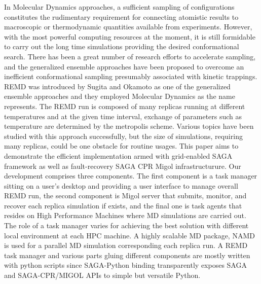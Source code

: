 \documentclass[times, 10pt,twocolumn]{article}
\begin{document}
In Molecular Dynamics approaches, a sufficient sampling of configurations constitutes the rudimentary requirement for connecting atomistic results to macroscopic or thermodynamic quantities available from experiments.   However,  with the most powerful computing resources at the moment, it is still formidable to carry out the long time simulations providing the desired conformational search.   There has been a great number of research efforts to accelerate sampling, and the generalized ensemble approaches have been proposed to overcome an inefficient conformational sampling presumably associated with kinetic trappings.  REMD was introduced by Sugita and Okamoto as one of the generalized ensemble approaches and they employed Molecular Dynamics as the name represents.  The REMD run is composed of many replicas running at different temperatures and at the given time interval, exchange of parameters such as temperature are determined by the metropolis scheme.  Various topics have been studied with this approach successfully, but the size of simulations, requiring many replicas, could be one obstacle for routine usages.  This paper aims to demonstrate the efficient implementation armed with grid-enabled SAGA framework as well as fault-recovery SAGA CPR Migol infrastructurure.  Our development comprises three components.  The first component is a task manager sitting on a user's desktop and providing a user interface to manage overall REMD run, the second component is Migol server that submits, monitor, and recover each replica simulation if exists, and the final one is task agents that resides on High Performance Machines where MD simulations are carried out.  The role of a task manager varies for achieving the best solution with different local environment at each HPC machine.  A highly scalable MD package, NAMD~\cite{Phillips:2005gd} is used for a parallel MD simulation corresponding each replica run.  A REMD task manager and various parts gluing different components are mostly written with python scripts since SAGA-Python binding transparently exposes SAGA and SAGA-CPR/MIGOL APIs to simple but versatile Python.

\label{sec:migol}
\end{document}
